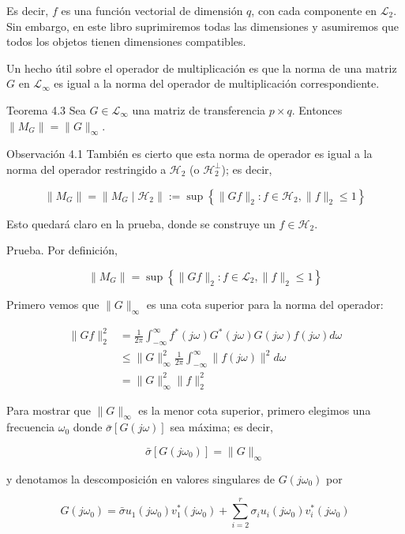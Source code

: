 Es decir, $f$ es una función vectorial de dimensión $q$, con cada componente en $\mathcal{L}_{2}$. Sin embargo, en este libro suprimiremos todas las dimensiones y asumiremos que todos los objetos tienen dimensiones compatibles.

Un hecho útil sobre el operador de multiplicación es que la norma de una matriz $G$ en $\mathcal{L}_{\infty}$ es igual a la norma del operador de multiplicación correspondiente.

Teorema 4.3 Sea $G \in \mathcal{L}_{\infty}$ una matriz de transferencia $p \times q$. Entonces $\left\|M_{G}\right\|=\|G\|_{\infty}$.

Observación 4.1 También es cierto que esta norma de operador es igual a la norma del operador restringido a $\mathcal{H}_{2}$ (o $\mathcal{H}_{2}^{\perp}$); es decir,

$$
\left\|M_{G}\right\|=\left\|M_{G} \mid \mathcal{H}_{2}\right\|:=\sup \left\{\|G f\|_{2}: f \in \mathcal{H}_{2},\|f\|_{2} \leq 1\right\}
$$

Esto quedará claro en la prueba, donde se construye un $f \in \mathcal{H}_{2}$.

Prueba. Por definición,

$$
\left\|M_{G}\right\|=\sup \left\{\|G f\|_{2}: f \in \mathcal{L}_{2},\|f\|_{2} \leq 1\right\}
$$

Primero vemos que $\|G\|_{\infty}$ es una cota superior para la norma del operador:

$$
\begin{aligned}
\|G f\|_{2}^{2} & =\frac{1}{2 \pi} \int_{-\infty}^{\infty} f^{*}(j \omega) G^{*}(j \omega) G(j \omega) f(j \omega) d \omega \\
& \leq\|G\|_{\infty}^{2} \frac{1}{2 \pi} \int_{-\infty}^{\infty}\|f(j \omega)\|^{2} d \omega \\
& =\|G\|_{\infty}^{2}\|f\|_{2}^{2}
\end{aligned}
$$

Para mostrar que $\|G\|_{\infty}$ es la menor cota superior, primero elegimos una frecuencia $\omega_{0}$ donde $\bar{\sigma}[G(j \omega)]$ sea máxima; es decir,

$$
\bar{\sigma}\left[G\left(j \omega_{0}\right)\right]=\|G\|_{\infty}
$$

y denotamos la descomposición en valores singulares de $G\left(j \omega_{0}\right)$ por

$$
G\left(j \omega_{0}\right)=\bar{\sigma} u_{1}\left(j \omega_{0}\right) v_{1}^{*}\left(j \omega_{0}\right)+\sum_{i=2}^{r} \sigma_{i} u_{i}\left(j \omega_{0}\right) v_{i}^{*}\left(j \omega_{0}\right)
$$

